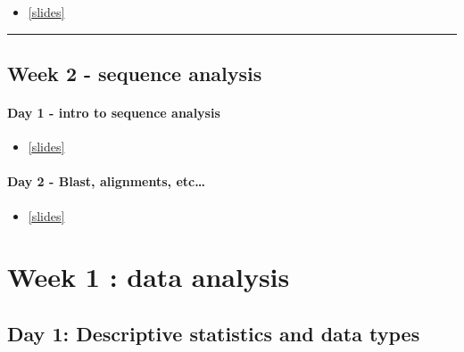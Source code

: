 \documentclass[
]{book}
\providecommand{\tightlist}{%
  \setlength{\itemsep}{0pt}\setlength{\parskip}{0pt}}
\begin{document}
\begin{itemize}
\tightlist
\item
  \href{./slides/GKBioinfo_week1_day5.pdf}{{[}slides{]}}
\end{itemize}

\begin{center}\rule{0.5\linewidth}{0.5pt}\end{center}

\hypertarget{week-2---sequence-analysis}{%
\section{Week 2 - sequence analysis}\label{week-2---sequence-analysis}}

\hypertarget{day-1---intro-to-sequence-analysis}{%
\subsubsection{Day 1 - intro to sequence analysis}\label{day-1---intro-to-sequence-analysis}}

\begin{itemize}
\tightlist
\item
  \href{./slides/GKBioinfo_week2.pdf}{{[}slides{]}}
\end{itemize}

\hypertarget{day-2---blast-alignments-etc}{%
\subsubsection{Day 2 - Blast, alignments, etc\ldots{}}\label{day-2---blast-alignments-etc}}

\begin{itemize}
\tightlist
\item
  \href{./slides/GKBioinfo_week2_2.pdf}{{[}slides{]}}
\end{itemize}

\hypertarget{week-1-data-analysis}{%
\chapter*{Week 1 : data analysis}\label{week-1-data-analysis}}

\hypertarget{day-1-descriptive-statistics-and-data-types}{%
\section*{Day 1: Descriptive statistics and data types}\label{day-1-descriptive-statistics-and-data-types}}
\end{document}
